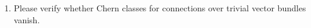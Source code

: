\documentclass[a4paper,11pt]{article}
\begin{document}
\begin{enumerate}
\item Please verify whether Chern classes for connections over trivial
  vector bundles vanish.





























\end{enumerate}
\end{document}
